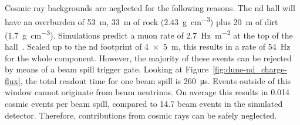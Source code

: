 Cosmic ray backgrounds are neglected for the following reasons.
The \gls{nd} hall will have an overburden of \SI{53}{\metre}, \SI{33}{\metre} of rock (\SI{2.43}{\gram\per\centi\metre\cubed}) plus \SI{20}{\metre} of dirt (\SI{1.7}{\gram\per\centi\metre\cubed}).
Simulations predict a muon rate of \SI{2.7}{\hertz\per\metre\squared} at the top of the hall~\cite{dune_ndtfr}.
Scaled up to the \AC{} \gls{nd} footprint of \SI{4 x 5}{\metre}, this results in a rate of \SI{54}{\hertz} for the whole \lartpc{} component.
However, the majority of these events can be rejected by means of a beam spill trigger gate.
Looking at Figure~\ref{fig:dune-nd_charge-flux}, the total readout time for one beam spill is \SI{260}{\micro\second}.
Events outside of this window cannot originate from beam neutrinos.
On average this results in \num{0.014} cosmic events per beam spill, compared to \num{14.7} beam events in the simulated detector.
Therefore, contributions from cosmic rays can be safely neglected.

